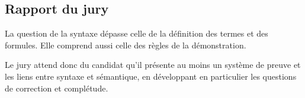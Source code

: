 \documentclass[../../Agregation.tex]{subfiles}
\begin{document}

\subsection{Rapport du jury}

\begin{aquote}{}
La question de la syntaxe dépasse celle de la définition des termes et des formules. Elle comprend aussi celle des règles de la démonstration.

Le jury attend donc du candidat qu'il présente au moins un système de preuve et les liens entre syntaxe et sémantique, en développant en particulier les questions de correction et complétude.
\end{aquote}
\end{document}
